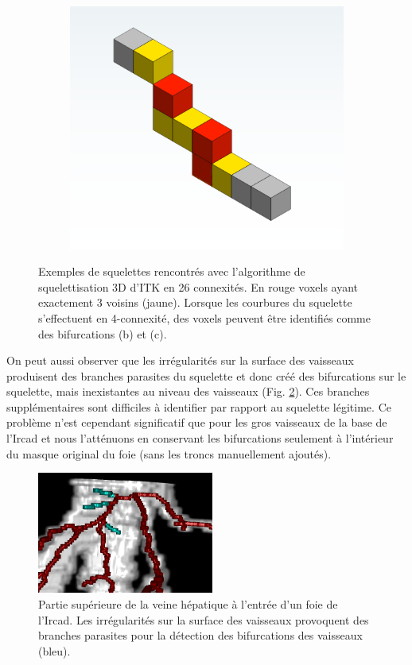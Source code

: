 \begin{figure}[!ht]
\begin{subfigure}{0.32\textwidth}
    \centering
    \includegraphics[width=\textwidth]{Images/problem_skel2.png}
    \caption{}
  \end{subfigure}

  \caption{Exemples de squelettes rencontrés avec l'algorithme de squelettisation 3D d'ITK en 26 connexités. En rouge voxels ayant exactement 3 voisins (jaune). Lorsque les courbures du squelette s'effectuent en 4-connexité, des voxels peuvent être identifiés comme des bifurcations (b) et (c).}
  \label{fig:skel_illustration}
\end{figure}

On peut aussi observer que les irrégularités sur la surface des vaisseaux produisent des branches parasites du squelette et donc créé des bifurcations sur le squelette, mais inexistantes au niveau des vaisseaux (Fig. \ref{fig:barbelures}). Ces branches supplémentaires sont difficiles à identifier par rapport au squelette légitime. Ce problème n'est cependant significatif que pour les gros vaisseaux de la base de l'Ircad et nous l'atténuons en conservant les bifurcations seulement à l'intérieur du masque original du foie (sans les troncs manuellement ajoutés).

\begin{figure}[!ht]
  \centering
  \includegraphics[height=4cm]{Images/barbelures.png}
  \caption{Partie supérieure de la veine hépatique à l'entrée d'un foie de l'Ircad. Les irrégularités sur la surface des vaisseaux provoquent des branches parasites pour la détection des bifurcations des vaisseaux (bleu).}
  \label{fig:barbelures}
\end{figure}


